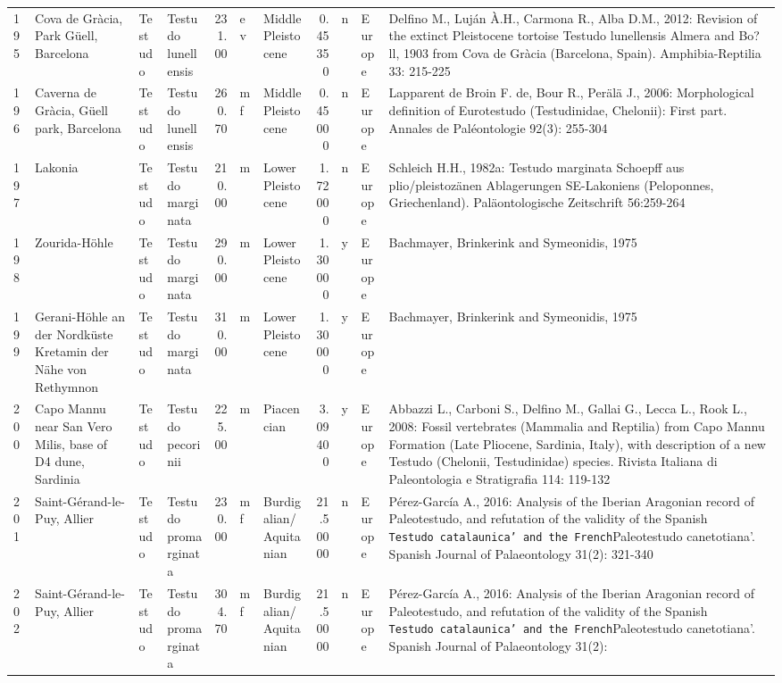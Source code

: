 \begin{landscape}
{\begin{longtable}[]{@{}llllrllrlll@{}}
	195 & Cova de Gràcia, Park Güell, Barcelona & Testudo & Testudo
	lunellensis & 231.00 & ev & Middle Pleistocene & 0.45350 & n & Europe &
	Delfino M., Luján À.H., Carmona R., Alba D.M., 2012: Revision of the
	extinct Pleistocene tortoise Testudo lunellensis Almera and Bo?ll, 1903
	from Cova de Gràcia (Barcelona, Spain). Amphibia-Reptilia 33:
	215-225\tabularnewline
	196 & Caverna de Gràcia, Güell park, Barcelona & Testudo & Testudo
	lunellensis & 260.70 & mf & Middle Pleistocene & 0.45000 & n & Europe &
	Lapparent de Broin F. de, Bour R., Perälä J., 2006: Morphological
	definition of Eurotestudo (Testudinidae, Chelonii): First part. Annales
	de Paléontologie 92(3): 255-304\tabularnewline
	197 & Lakonia & Testudo & Testudo marginata & 210.00 & m & Lower
	Pleistocene & 1.72000 & n & Europe & Schleich H.H., 1982a: Testudo
	marginata Schoepff aus plio/pleistozänen Ablagerungen SE-Lakoniens
	(Peloponnes, Griechenland). Paläontologische Zeitschrift
	56:259-264\tabularnewline
	198 & Zourida-Höhle & Testudo & Testudo marginata & 290.00 & m & Lower
	Pleistocene & 1.30000 & y & Europe & Bachmayer, Brinkerink and
	Symeonidis, 1975\tabularnewline
	199 & Gerani-Höhle an der Nordküste Kretamin der Nähe von Rethymnon &
	Testudo & Testudo marginata & 310.00 & m & Lower Pleistocene & 1.30000 &
	y & Europe & Bachmayer, Brinkerink and Symeonidis, 1975\tabularnewline
	200 & Capo Mannu near San Vero Milis, base of D4 dune, Sardinia &
	Testudo & Testudo pecorinii & 225.00 & m & Piacencian & 3.09400 & y &
	Europe & Abbazzi L., Carboni S., Delfino M., Gallai G., Lecca L., Rook
	L., 2008: Fossil vertebrates (Mammalia and Reptilia) from Capo Mannu
	Formation (Late Pliocene, Sardinia, Italy), with description of a new
	Testudo (Chelonii, Testudinidae) species. Rivista Italiana di
	Paleontologia e Stratigrafia 114: 119-132\tabularnewline
	201 & Saint-Gérand-le-Puy, Allier & Testudo & Testudo promarginata &
	230.00 & mf & Burdigalian/Aquitanian & 21.50000 & n & Europe &
	Pérez-García A., 2016: Analysis of the Iberian Aragonian record of
	Paleotestudo, and refutation of the validity of the Spanish
	\texttt{Testudo\ catalaunica'\ and\ the\ French}Paleotestudo
	canetotiana'. Spanish Journal of Palaeontology 31(2):
	321-340\tabularnewline
	202 & Saint-Gérand-le-Puy, Allier & Testudo & Testudo promarginata &
	304.70 & mf & Burdigalian/Aquitanian & 21.50000 & n & Europe &
	Pérez-García A., 2016: Analysis of the Iberian Aragonian record of
	Paleotestudo, and refutation of the validity of the Spanish
	\texttt{Testudo\ catalaunica'\ and\ the\ French}Paleotestudo
	canetotiana'. Spanish Journal of Palaeontology 31(2):

\end{longtable}}
\end{landscape}
